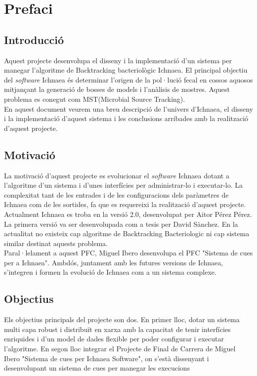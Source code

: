 \chapter{Prefaci}
\label{cha:prefaci}

\section{Introducció}
\label{sec:abast}
Aquest projecte desenvolupa el disseny i la implementació d'un sistema per manegar l'algoritme de Backtracking bacteriològic Ichnaea. El principal objectiu del \textit{software} Ichnaea \'{e}s determinar l'origen de la pol·lució fecal en cossos aquosos mitjançant la generació de bosses de models i l'anàlisis de mostres. Aquest problema es conegut com MST(Microbial Source Tracking).\\

En aquest document veurem una breu descripció de l'univers d'Ichnaea, el disseny i la implementació d'aquest sistema i les conclusions arribades amb la realització d'aquest projecte.

\section{Motivació}
La motivació d'aquest projecte es evolucionar el \textit{software} Ichnaea dotant a l'algoritme d'un sistema i d'unes interfícies per administrar-lo i executar-lo. La complexitat tant de les entrades i de les configuracions dels paràmetres de Ichnaea com de les sortides, fa que es requereixi la realització d'aquest projecte.\\

Actualment Ichnaea es troba en la versi\'{o} 2.0, desenvolupat per Aitor P\'{e}rez P\'{e}rez. La primera versi\'{o} va ser desenvolupada com a tesis per David Sànchez. En la actualitat no existeix cap algoritme de Backtracking Bacteriologic ni cap sistema similar destinat aquests problema.\\

Paral·lelament a aquest PFC, Miguel Ibero desenvolupa el PFC "Sistema de cues per a Ichnaea". Ambdós, juntament amb les futures versions de Ichnaea, s'integren i formen la evolució de Ichnaea com a un sistema complexe.

\section{Objectius}
\label{sec:objetius}
Els objectius principals del projecte son dos. En primer lloc, dotar un sistema multi capa robust i distribuït en xarxa amb la capacitat de tenir  interfícies enriquides i d'un model de dades flexible per poder configurar i executar l'algoritme. En segon lloc integrar el Projecte de Final de Carrera de Miguel Ibero "Sistema de cues per Ichnaea Software", on s'est\`{a} dissenyant i desenvolupant un sistema de cues per manegar les execucions\\

